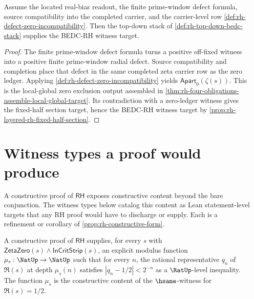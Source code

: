 \begin{theorem}
\label{thm:rh-defect-incompatibility-stack-hinge}
Assume the located real-bias readout, the finite prime-window defect formula,
source compatibility into the completed carrier, and the carrier-level row
\autoref{def:rh-defect-zero-incompatibility}.  Then the top-down stack of
\autoref{def:rh-top-down-bedc-stack} supplies the BEDC-RH witness target.
\end{theorem}

\begin{proof}
The finite prime-window defect formula turns a positive off-fixed witness
into a positive finite prime-window radial defect.  Source compatibility and
completion place that defect in the same completed zeta carrier row as the
zero ledger.  Applying \autoref{def:rh-defect-zero-incompatibility} yields
$\mathsf{Apart}_{0}(\zeta(s))$.  This is the local-global zero exclusion
output assembled in \autoref{thm:rh-four-obligations-assemble-local-global-target}.
Its contradiction with a zero-ledger witness gives the fixed-half section
target, hence the BEDC-RH witness target by
\autoref{prop:rh-layered-rh-fixed-half-section}.
\end{proof}

\section{Witness types a proof would produce}
\label{sec:rh-witness-types}

A constructive proof of $\mathsf{RH}$ exposes constructive content beyond the bare conjunction. The witness types below catalog this content as Lean statement-level targets that any RH proof would have to discharge or supply. Each is a refinement or corollary of \autoref{prop:rh-constructive-form}.

\begin{theorem}
\label{thm:rh-witness-modulus}
A constructive proof of $\mathsf{RH}$ supplies, for every $s$ with $\mathsf{ZetaZero}(s) \wedge \mathsf{InCritStrip}(s)$, an explicit modulus function $\mu_s : \NatUp \to \NatUp$ such that for every $n$, the rational representative $q_n$ of $\Re(s)$ at depth $\mu_s(n)$ satisfies $|q_n - 1/2| < 2^{-n}$ as a $\RatUp$-level inequality. The function $\mu_s$ is the constructive content of the $\hsame$-witness for $\Re(s) = 1/2$.
\end{theorem}

